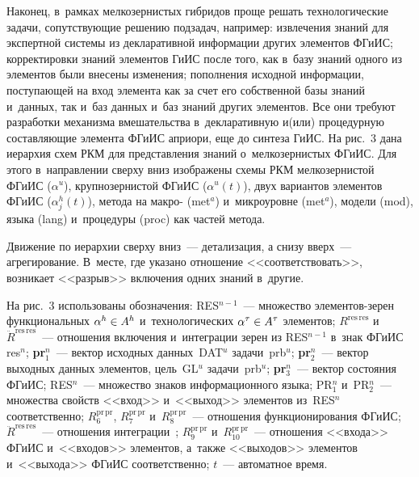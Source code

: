\begin{multicols}{2}
Наконец, в~рамках мелкозернистых 
гибридов проще решать технологические задачи, сопутствующие решению подзадач, 
например: извлечения знаний для экспертной системы из декларативной информации других 
элементов \mbox{ФГиИС}; корректировки знаний элементов ГиИС после того, как 
в~базу знаний одного из элементов были внесены изменения; пополнения исходной 
информации, поступающей на вход элемента как за счет его собственной базы знаний 
и~данных, так и~баз данных и~баз знаний других элементов. Все они требуют разработки 
механизма вмешательства в~декларативную и(или) процедурную составляющие элемента 
\mbox{ФГиИС} априори, еще до синтеза ГиИС. На рис.~3 дана иерархия схем РКМ 
для представления знаний о~мелкозернистых \mbox{ФГиИС}. Для этого в~направлении сверху вниз 
изображены схемы РКМ мелкозернистой \mbox{ФГиИС} ($\alpha^u$), крупнозернистой \mbox{ФГиИС} 
($\alpha^u(t)$), двух вариантов элементов \mbox{ФГиИС} ($\alpha_j^h(t)$), метода на макро- 
(met$^a$) и~микроуровне (met$^a$), модели (mod), языка (lang) и~процедуры (proc) как 
частей метода.
  
  Движение по иерархии сверху вниз~--- детализация, а снизу вверх~--- агрегирование. 
В~месте, где указано отношение <<соответствовать>>, возникает <<разрыв>> включения 
одних знаний в~другие.
  
  На рис.~3 использованы обозначения: RES$^{n-1}$~--- множество эле\-мен\-тов-зе\-рен 
функциональных $\alpha^h\hm\in A^h$ и~технологических $\alpha^\tau\hm\in A^\tau$ 
элементов; $R^{\mathrm{res\,res}}$ и~$\ddot{R}^{\mathrm{res\,res}}$~--- отношения 
включения и~интеграции зерен из RES$^{n-1}$ в~знак ФГиИС res$^n$; \textbf{pr}$^n_1$~--- 
вектор исходных данных~DAT$^u$ задачи~prb$^u$; \textbf{pr}$^n_2$~--- вектор выходных 
данных элементов, цель~GL$^u$ задачи~prb$^u$; \textbf{pr}$^n_3$~--- вектор состояния 
ФГиИС; RES$^n$~--- множество знаков информационного языка; PR$_1^n$ и~PR$_2^n$~--- 
множества свойств <<вход>> и~<<выход>> элементов из~RES$^n$ соответственно; 
$R_6^{\mathrm{pr\,pr}}$, $R_7^{\mathrm{pr\,pr}}$ и~$R_8^{\mathrm{pr\,pr}}$~--- отношения 
функционирования ФГиИС; $\ddot{R}^{\mathrm{res\,res}}$~--- отношения 
интеграции~\cite{11-kir, 17-kir};  $R_9^{\mathrm{pr\,pr}}$ и~$R_{10}^{\mathrm{pr\,pr}}$~--- 
отношения <<входа>> ФГиИС и~<<входов>> элементов, а~так\-же <<выходов>> элементов 
и~<<выхода>> ФГиИС соответственно; $t$~--- автоматное время.
  
     \begin{figure*} %
     \vspace*{1pt}
 \begin{center}
 \mbox{%
 \epsfxsize=156.281mm
 }
 \end{center}
 \vspace*{-9pt}
\end{figure*}


\end{multicols}

